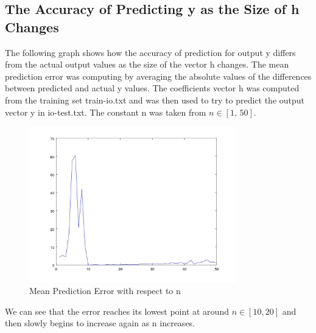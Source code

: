 \documentclass{article}
\begin{document}
\subsection{The Accuracy of Predicting y as the Size of h Changes}
\begin{flushleft}
The following graph shows how the accuracy of prediction for output y differs from the actual output values as the size of the vector h changes. The mean prediction error was computing by averaging the absolute values of the differences between predicted and actual y values. The coefficients vector h was computed from the training set train-io.txt and was then used to try to predict the output vector y in io-test.txt. The constant n was taken from \begin{math}n \in [1,\, 50]\end{math}.

\begin{figure}[ht!]
\centering
\includegraphics[width=90mm]{graph.jpg}
\caption{Mean Prediction Error with respect to n \label{overflow}}
\end{figure}
We can see that the error reaches its lowest point at around $n \in [10, 20]$ and then slowly begins to increase again as n increases.
\end{flushleft}
\pagebreak
\end{document}
